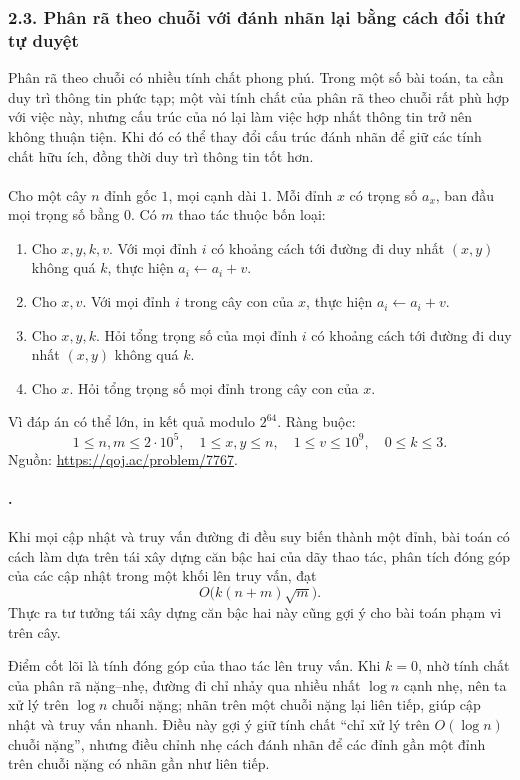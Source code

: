 \documentclass[11pt]{article}
\begin{document}
\subsubsection*{2.3. Phân rã theo chuỗi với đánh nhãn lại bằng cách đổi thứ tự duyệt}

Phân rã theo chuỗi có nhiều tính chất phong phú. Trong một số bài toán, ta cần
duy trì thông tin phức tạp; một vài tính chất của phân rã theo chuỗi rất phù
hợp với việc này, nhưng cấu trúc của nó lại làm việc hợp nhất thông tin trở
nên không thuận tiện. Khi đó có thể thay đổi cấu trúc đánh nhãn để giữ các
tính chất hữu ích, đồng thời duy trì thông tin tốt hơn.

\paragraph{}
Cho một cây \(n\) đỉnh gốc \(1\), mọi cạnh dài \(1\). Mỗi đỉnh \(x\) có trọng
số \(a_x\), ban đầu mọi trọng số bằng \(0\). Có \(m\) thao tác thuộc bốn loại:
\begin{enumerate}
  \item Cho \(x,y,k,v\). Với mọi đỉnh \(i\) có khoảng cách tới đường đi duy
  nhất \((x,y)\) không quá \(k\), thực hiện \(a_i\leftarrow a_i+v\).
  \item Cho \(x,v\). Với mọi đỉnh \(i\) trong cây con của \(x\), thực hiện
  \(a_i\leftarrow a_i+v\).
  \item Cho \(x,y,k\). Hỏi tổng trọng số của mọi đỉnh \(i\) có khoảng cách tới
  đường đi duy nhất \((x,y)\) không quá \(k\).
  \item Cho \(x\). Hỏi tổng trọng số mọi đỉnh trong cây con của \(x\).
\end{enumerate}
Vì đáp án có thể lớn, in kết quả modulo \(2^{64}\). Ràng buộc:
\[
  1\le n,m\le 2\cdot 10^5,\quad
  1\le x,y\le n,\quad 1\le v\le 10^9,\quad 0\le k\le 3.
\]
Nguồn: \url{https://qoj.ac/problem/7767}.

\paragraph{.}
Khi mọi cập nhật và truy vấn đường đi đều suy biến thành một đỉnh, bài toán có
cách làm dựa trên tái xây dựng căn bậc hai của dãy thao tác, phân tích đóng
góp của các cập nhật trong một khối lên truy vấn, đạt
\[
  O\bigl(k(n+m)\sqrt m\bigr).
\]
Thực ra tư tưởng tái xây dựng căn bậc hai này cũng gợi ý cho bài toán phạm vi
trên cây.

Điểm cốt lõi là tính đóng góp của thao tác lên truy vấn. Khi \(k=0\), nhờ tính
chất của phân rã nặng--nhẹ, đường đi chỉ nhảy qua nhiều nhất \(\log n\) cạnh
nhẹ, nên ta xử lý trên \(\log n\) chuỗi nặng; nhãn trên một chuỗi nặng lại
liên tiếp, giúp cập nhật và truy vấn nhanh. Điều này gợi ý giữ tính chất
``chỉ xử lý trên \(O(\log n)\) chuỗi nặng'', nhưng điều chỉnh nhẹ cách đánh
nhãn để các đỉnh gần một đỉnh trên chuỗi nặng có nhãn gần như liên tiếp.
\end{document}
